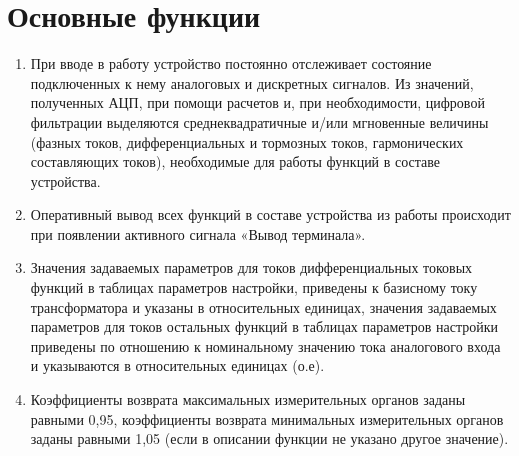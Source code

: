 \color{unidarkgreen}\section[Основные функции]{Основные функции}\label{sec:funcs}
\color{black}

\color{black}

\begin{enumerate}[label=\arabic{section}.\arabic{subsection}.\arabic*, labelsep=4pt, leftmargin=0pt, itemindent=57pt]
    
\item
При вводе в работу устройство постоянно отслеживает состояние подключенных к нему аналоговых и дискретных сигналов. Из значений, полученных АЦП, при помощи расчетов и, при необходимости, цифровой фильтрации выделяются среднеквадратичные и/или мгновенные величины (фазных токов, дифференциальных и тормозных токов, гармонических составляющих токов), необходимые для работы функций в составе устройства.
\item
Оперативный вывод всех функций в составе устройства из работы происходит при появлении активного сигнала «Вывод терминала».
\item
Значения задаваемых параметров для токов дифференциальных токовых функций в таблицах параметров настройки, приведены к базисному току трансформатора и указаны в относительных единицах, значения задаваемых параметров для токов остальных функций в таблицах параметров настройки приведены по отношению к номинальному значению тока аналогового входа и указываются в относительных единицах (о.е).  
\item
Коэффициенты возврата максимальных измерительных органов заданы равными 0,95, коэффициенты возврата минимальных измерительных органов заданы равными 1,05 (если в описании функции не указано другое значение).


\end{enumerate}
